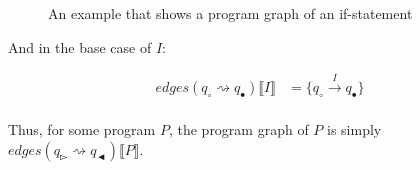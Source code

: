 \begin{figure}[htb!]
    \center
    
    \caption{An example that shows a program graph of an if-statement}
    \label{fig:non-deterministic-choice}
\end{figure}

And in the base case of $I$:

\begin{align}
    edges(q_\circ \rightsquigarrow q_\bullet) \lBrack I \rBrack &= \{q_\circ \xrightarrow{I} q_\bullet\}\label{eq:equation11} \\
\end{align}

Thus, for some program $P$, the program graph of $P$ is simply $edges(q_\whitepointerright \rightsquigarrow q_\blackpointerleft)\lBrack P \rBrack$.
